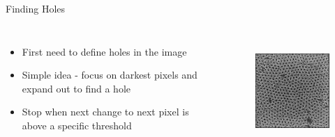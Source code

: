 \documentclass{beamer}
\begin{document}
\begin{frame}{Finding Holes}
\begin{columns}
	\begin{itemize}
		\item
		First need to define holes in the image
		\item 
		Simple idea - focus on darkest pixels and expand out to find a hole
		\item
		Stop when next change to next pixel is above a specific threshold
	\end{itemize}
		\begin{figure}
			\includegraphics[height=120pt]{images/image10.jpeg}
		\end{figure}
\end{columns}

\end{frame}
\end{document}
